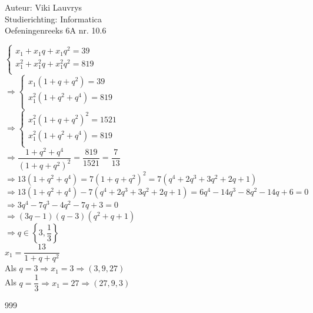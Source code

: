 \documentclass[a4paper]{article}
\begin{document}
  
\noindent \large Auteur: Viki	Lauvrys \\
\noindent \large Studierichting: Informatica\\
\noindent \large Oefeningenreeks 6A nr. 10.6\\

\medskip

\normalsize

$
\left\{
\begin{array}{l}
 x_1 + x_1 q + x_1 q^2 = 39 \\
 x_1^2 + x_1^2 q + x_1^2 q^2 = 819 \\
 \end{array}
 \right .
$ \\

$
\Rightarrow \left\{
\begin{array}{l}
 x_1 ( 1+ q + q^2) = 39 \\
 x_1^2 ( 1+ q^2 + q^4) = 819 \\
 \end{array}
 \right .
$ \\

$
\Rightarrow \left\{
\begin{array}{l}
 x_1^2 ( 1+ q + q^2)^2 = 1521 \\
 x_1^2 ( 1+ q^2 + q^4) = 819 \\
 \end{array}
 \right .
$ \\

$ \Rightarrow \dfrac{1 +q^2 + q^4}{(1+q +q^2)^2} = \dfrac{819}{1521} = \dfrac{7}{13} $ \\

$ \Rightarrow 13(1 + q^2 + q^4) = 7 (1 +q +q^2)^2 = 7(q^4 +2q^3 +3q^2 +2q +1) $ \\

$ \Rightarrow 13(1 + q^2 + q^4) - 7 (q^4 +2q^3 +3q^2 +2q +1) = 6q^4 -14q^3 -8q^2 -14q +6 = 0 $ \\

$ \Rightarrow 3q^4 -7q^3 -4q^2 -7q +3 = 0 $ \\

$ \Rightarrow (3q -1)(q-3)(q^2 +q +1) $\\

$ \Rightarrow q \in \left\{ 3, \dfrac{1}{3} \right\} $ \\

$ x_1 = \dfrac{13}{1 +q +q^2} $ \\

Als $ q = 3 \Rightarrow x_1 = 3 \Rightarrow (3, 9, 27) $ \\

Als $ q = \dfrac{1}{3} \Rightarrow x_1 = 27 \Rightarrow (27, 9, 3) $ \\

\begin{thebibliography}{999}
\end{thebibliography}
\end{document}

